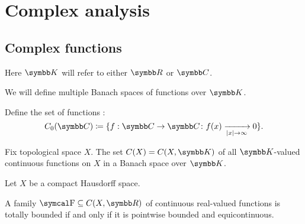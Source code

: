 \section{Complex analysis}\label{sec:complex_analysis}
\subsection{Complex functions}\label{subsec:complex_functions}

Here \( \K \) will refer to either \( \R \) or \( \C \).

\begin{definition}\label{def:function_spaces}
  We will define multiple Banach spaces of functions over \( \K \).

  \begin{defenum}
     Define the set of functions :
    \begin{equation*}
      C_0(\C) \coloneqq \{ f: \C \to \C \colon f(x) \xrightarrow[\Abs{x} \to \infty]{} 0 \}.
    \end{equation*}

     Fix topological space \( X \). The set \( C(X) = C(X, \K) \) of all \( \K \)-valued continuous functions on \( X \) in a Banach space over \( \K \).
  \end{defenum}
\end{definition}

\begin{theorem}\label{thm:arzela_ascoli}\cite[corollary 10.49]{Knapp2016BAlg}
  Let \( X \) be a compact Hausdorff space.

  A family \( \F \subseteq C(X, \R) \) of continuous real-valued functions is totally bounded if and only if it is pointwise bounded and equicontinuous.
\end{theorem}
